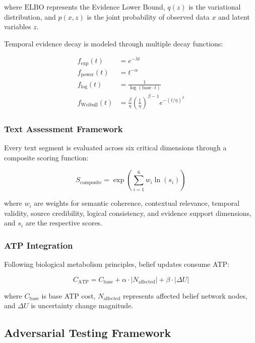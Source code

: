 \documentclass[12pt,a4paper]{article}
\begin{document}
where $\text{ELBO}$ represents the Evidence Lower Bound, $q(z)$ is the variational distribution, and $p(x,z)$ is the joint probability of observed data $x$ and latent variables $z$.

Temporal evidence decay is modeled through multiple decay functions:

\begin{align}
f_{\text{exp}}(t) &= e^{-\lambda t} \\
f_{\text{power}}(t) &= t^{-\alpha} \\
f_{\text{log}}(t) &= \frac{1}{\log(\text{base} \cdot t)} \\
f_{\text{Weibull}}(t) &= \frac{\beta}{\eta}\left(\frac{t}{\eta}\right)^{\beta-1}e^{-(t/\eta)^{\beta}}
\end{align}

\subsubsection{Text Assessment Framework}

Every text segment is evaluated across six critical dimensions through a composite scoring function:

\begin{equation}
S_{\text{composite}} = \exp\left(\sum_{i=1}^{6} w_i \ln(s_i)\right)
\end{equation}

where $w_i$ are weights for semantic coherence, contextual relevance, temporal validity, source credibility, logical consistency, and evidence support dimensions, and $s_i$ are the respective scores.

\subsubsection{ATP Integration}

Following biological metabolism principles, belief updates consume ATP:

\begin{equation}
C_{\text{ATP}} = C_{\text{base}} + \alpha \cdot |N_{\text{affected}}| + \beta \cdot |\Delta U|
\end{equation}

where $C_{\text{base}}$ is base ATP cost, $N_{\text{affected}}$ represents affected belief network nodes, and $\Delta U$ is uncertainty change magnitude.

\subsection{Adversarial Testing Framework}
\end{document}
